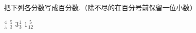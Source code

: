 把下列各分数写成百分数.（除不尽的在百分号前保留一位小数）
\begin{subquestions}
    \subquestion $\frac{4}{5}$
    \subquestion $\frac{5}{3}$
    \subquestion $3\frac{1}{3}$
    \subquestion $1\frac{5}{12}$

\end{subquestions}